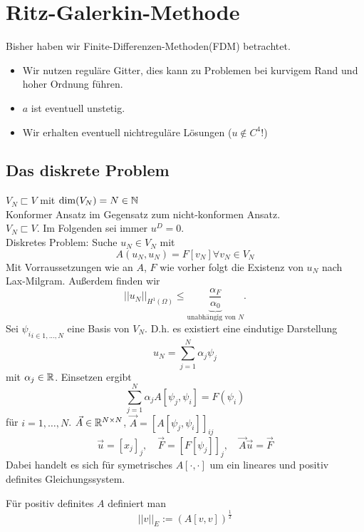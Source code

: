 \section{Ritz-Galerkin-Methode}
Bisher haben wir Finite-Differenzen-Methoden(FDM) betrachtet.
\begin{bemerkung}
\begin{itemize}
\item Wir nutzen reguläre Gitter, dies kann zu Problemen bei kurvigem Rand und hoher Ordnung führen.
\item $a$ ist eventuell unstetig.
\item Wir erhalten eventuell nichtreguläre Lösungen ($u\notin C^4$!)
\end{itemize}
\subsection{Das diskrete Problem}
$V_N \sqsubset V$ mit $\dim(V_N)=N \in \mathbb{N}$\\
Konformer Ansatz im Gegensatz zum nicht-konformen Ansatz.\\
$V_N \sqsubset V$. Im Folgenden sei immer $u^D = 0$.\\
Diskretes Problem: Suche $u_N \in V_N$ mit 
\[A(u_N, u_N) = F[v_N] \forall v_N \in V_N\]
Mit Vorraussetzungen wie an $A$, $F$ wie vorher folgt die Existenz von $u_N$ nach Lax-Milgram. Außerdem finden wir
\[||u_N||_{H^1(\Omega)} \leq \underbrace{\frac{\alpha_F}{\alpha_0}}_{\text{unabhängig von }N}.\]
Sei ${\psi_i}_{i \in {1,...,N}}$ eine Basis von $V_N$. D.h. es existiert eine eindutige Darstellung
\[u_N = \sum_{j=1}^{N}\alpha_j \psi_j \]
mit $\alpha_j \in \mathbb{R}$. Einsetzen ergibt
\[\sum_{j=1}^{N}\alpha_j A [\psi_j, \psi_i] = F(\psi_i)\] 
für $i=1,\ldots , N$. $\vec{A}\in\mathbb{R}^{N\times N}$, $\vec{A}=[A[\psi_j, \psi_i]]_{ij}$
\[\vec{u} = [x_j]_j,\quad \vec{F}=[F[\psi_j]]_j, \quad \vec{A}\vec{u}=\vec{F} \]
Dabei handelt es sich für symetrisches $A[\cdot, \cdot]$ um ein lineares und positiv definites Gleichungssystem.
\begin{definition}[Energienorm]
Für positiv definites $A$ definiert man 
\[||v||_E := \left( A[v,v]\right)^{\frac{1}{2}}\]

\end{definition}
\end{bemerkung}
